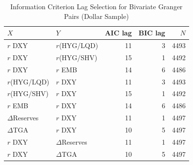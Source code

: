 \begin{table}[H]
\centering
\begin{tabular}{llrrr}
  \toprule
$X$ & $Y$ & AIC lag & BIC lag & $N$ \\ 
  \midrule
$r$ DXY & $r$(HYG/LQD) & 11 & 3 & 4493 \\ 
  $r$ DXY & $r$(HYG/SHV) & 15 & 1 & 4492 \\ 
  $r$ DXY & $r$ EMB & 14 & 6 & 4486 \\ 
  $r$(HYG/LQD) & $r$ DXY & 11 & 3 & 4493 \\ 
  $r$(HYG/SHV) & $r$ DXY & 15 & 1 & 4492 \\ 
  $r$ EMB & $r$ DXY & 14 & 6 & 4486 \\ 
  $\Delta$Reserves & $r$ DXY & 11 & 1 & 4497 \\ 
  $\Delta$TGA & $r$ DXY & 10 & 5 & 4497 \\ 
  $r$ DXY & $\Delta$Reserves & 11 & 1 & 4497 \\ 
  $r$ DXY & $\Delta$TGA & 10 & 5 & 4497 \\ 
   \bottomrule
\end{tabular}
\caption{Information Criterion Lag Selection for Bivariate Granger Pairs (Dollar Sample)} 
\label{tab:lag_selection_dollar}
\end{table}
